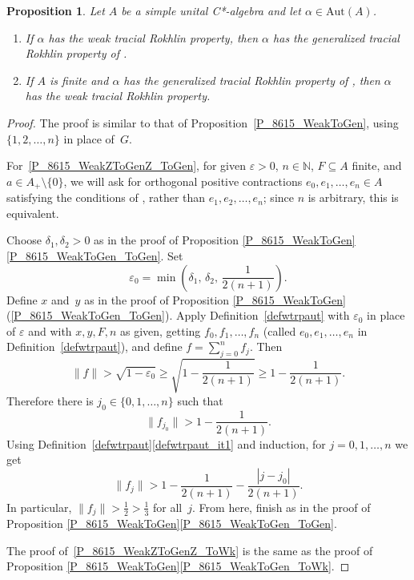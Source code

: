 \documentclass[11pt]{amsart}
\theoremstyle{plain}
\newtheorem{proposition}[theorem]{Proposition}
\theoremstyle{definition}
\theoremstyle{remark}
\numberwithin{equation}{section}
\newcommand{\N}{\mathbb{N}}
\newcommand{\dt}{\delta}
\newcommand{\ep}{\varepsilon}
\begin{document}
\begin{proposition}\label{P_8615_WeakZToGenZ}
Let $A$ be a simple unital C*-algebra
and let $\alpha \in \mathrm{Aut} (A)$.
%
\begin{enumerate}[label=$\mathrm{(\arabic*)}$]
%
\item\label{P_8615_WeakZToGenZ_ToGen}
If $\alpha$ has the weak tracial Rokhlin property,
then $\alpha$ has the generalized tracial Rokhlin property
of \cite[Definition 6.1]{HO13}.
%
\item\label{P_8615_WeakZToGenZ_ToWk}
If $A$ is finite
and $\alpha$ has the generalized tracial Rokhlin property
of \cite[Definition 6.1]{HO13},
then $\alpha$ has the weak tracial Rokhlin property.
\end{enumerate}
%
\end{proposition}

\begin{proof}
The proof is similar to
that of Proposition~\ref{P_8615_WeakToGen},
using $\{ 1, 2, \ldots, n \}$ in place of~$G$.

For~\ref{P_8615_WeakZToGenZ_ToGen},
for given $\ep > 0$,
$n \in \N$,
$F \subseteq A$ finite,
and $a \in A_{+} \setminus \{ 0 \}$,
we will ask for
orthogonal positive contractions $e_{0}, e_{1}, \ldots, e_{n} \in A$
satisfying the conditions of \cite[Definition 6.1]{HO13},
rather than $e_{1}, e_{2}, \ldots, e_{n}$;
since $n$ is arbitrary,
this is equivalent.

Choose $\dt_1, \dt_2 > 0$ as in the proof of
Proposition \ref{P_8615_WeakToGen}\ref{P_8615_WeakToGen_ToGen}.
Set
\[
\ep_0 = \min \left( \dt_1, \, \dt_2, \, \frac{1}{2 (n + 1)} \right).
\]
Define $x$ and~$y$ as
in the proof of
Proposition \ref{P_8615_WeakToGen}(\ref{P_8615_WeakToGen_ToGen}).
Apply Definition~\ref{defwtrpaut}
with $\varepsilon_0$ in place of $\varepsilon$ and
with $x,y,F,n$ as given,
getting
$f_0, f_1, \ldots, f_n$ (called
$e_0, e_1, \ldots, e_n$ in Definition~\ref{defwtrpaut}),
and define $f = \sum_{j = 0}^{n} f_{j}$.
Then
\[
\| f \|
 > \sqrt{1 - \ep_0}
 \geq \sqrt{1 - \frac{1}{2 (n + 1)}}
 \geq 1 - \frac{1}{2 (n + 1)}.
\]
Therefore there is $j_0 \in \{ 0, 1, \ldots, n \}$
such that
\[
\| f_{j_0} \| > 1 - \frac{1}{2 (n + 1)}.
\]
Using Definition~\ref{defwtrpaut}\eqref{defwtrpaut_it1}
and induction,
for $j = 0, 1, \ldots, n$ we get
\[
\| f_j \| > 1 - \frac{1}{2 (n + 1)} - \frac{| j - j_0 |}{2 (n + 1)}.
\]
In particular,
$\| f_j \| > \frac{1}{2} > \frac{1}{3}$ for all~$j$.
{}From here,
finish as in the proof of
Proposition \ref{P_8615_WeakToGen}\ref{P_8615_WeakToGen_ToGen}.

The proof of~\ref{P_8615_WeakZToGenZ_ToWk}
is the same as the proof of
Proposition \ref{P_8615_WeakToGen}\ref{P_8615_WeakToGen_ToWk}.
\end{proof}
\end{document}
